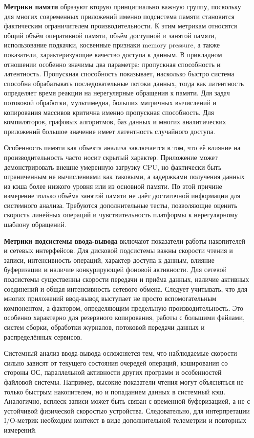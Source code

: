 \textbf{Метрики памяти} образуют вторую принципиально важную группу, поскольку для многих современных приложений именно подсистема памяти становится фактическим ограничителем производительности. К этим метрикам относятся общий объём оперативной памяти, объём доступной и занятой памяти, использование подкачки, косвенные признаки memory pressure, а также показатели, характеризующие качество доступа к данным. В прикладном отношении особенно значимы два параметра: пропускная способность и латентность. Пропускная способность показывает, насколько быстро система способна обрабатывать последовательные потоки данных, тогда как латентность определяет время реакции на нерегулярные обращения к памяти. Для задач потоковой обработки, мультимедиа, больших матричных вычислений и копирования массивов критична именно пропускная способность. Для компиляторов, графовых алгоритмов, баз данных и многих аналитических приложений большое значение имеет латентность случайного доступа.

Особенность памяти как объекта анализа заключается в том, что её влияние на производительность часто носит скрытый характер. Приложение может демонстрировать внешне умеренную загрузку CPU, но фактически быть ограниченным не вычислениями как таковыми, а задержками получения данных из кэша более низкого уровня или из основной памяти. По этой причине измерение только объёма занятой памяти не даёт достаточной информации для системного анализа. Требуются дополнительные тесты, позволяющие оценить скорость линейных операций и чувствительность платформы к нерегулярному шаблону обращений.

\textbf{Метрики подсистемы ввода-вывода} включают показатели работы накопителей и сетевых интерфейсов. Для дисковой подсистемы важны скорости чтения и записи, интенсивность операций, характер доступа к данным, влияние буферизации и наличие конкурирующей фоновой активности. Для сетевой подсистемы существенны скорости передачи и приёма данных, наличие активных соединений и общая интенсивность сетевого обмена. Следует учитывать, что для многих приложений ввод-вывод выступает не просто вспомогательным компонентом, а фактором, определяющим предельную производительность. Это особенно характерно для резервного копирования, работы с большими файлами, систем сборки, обработки журналов, потоковой передачи данных и распределённых сервисов.

Системный анализ ввода-вывода осложняется тем, что наблюдаемые скорости сильно зависят от текущего состояния очередей операций, кэширования со стороны ОС, параллельной активности других программ и особенностей файловой системы. Например, высокие показатели чтения могут объясняться не только быстрым накопителем, но и попаданием данных в системный кэш. Аналогично, всплеск записи может быть связан с временной буферизацией, а не с устойчивой физической скоростью устройства. Следовательно, для интерпретации I/O-метрик необходим контекст в виде дополнительной телеметрии и повторных измерений.

